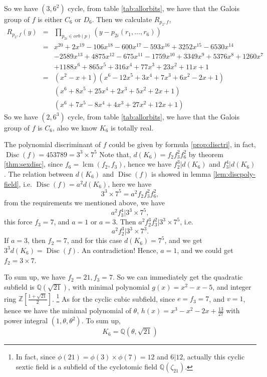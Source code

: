 So we have $(3,6^2)$ cycle, from table \ref{tab:allorbits}, we have that the Galois group of $f$ is either $C_6$ or $D_6$. Then we calculate $R_{p_2,f}$,
\begin{eqnarray*}
R_{p_2,f}(y)&=&\prod_{p_{2i}\in orb(p)}(y-p_{2i}(r_1,\dots,r_6))\\
&=& x^{20} + 2 x^{19} - 106 x^{18} - 600 x^{17} - 593 x^{16} + 3252 x^{15} - 6530 x^{14}\\
&& -2589 x^{13} + 4875 x^{12} - 675 x^{11} - 1759 x^{10} + 3349 x^9 + 5376 x^8 + 1260 x^7 \\
&&+ 1188 x^6 + 865 x^5 + 316 x^4 + 77 x^3 + 23 x^2 + 11 x + 1
\\
&=&(x^2 - x + 1) (x^6 - 12 x^5 + 3 x^4 + 7 x^3 + 6 x^2 - 2 x + 1) \\
&&(x^6 + 8 x^5 + 25 x^4 + 2 x^3 + 5 x^2 + 2 x + 1) \\
&&(x^6 + 7 x^5 - 8 x^4 + 4 x^3 + 27 x^2 + 12 x + 1)
\end{eqnarray*}  
So we have $(2,6^3)$ cycle, from table \ref{tab:allorbits}, we have that the Galois group of $f$ is $C_6$, also we know $K_6$ is totally real.

The polynomial discriminant of $f$ could be given by formula \ref{prop:disctri}, in fact, $\operatorname{Disc}(f)=453789=3^3\times7^5$
Note that, $d(K_6)=f_2f_3^2f_6^2$ by theorem \ref{thm:sexdisc}, since $f_6=\operatorname{lcm}(f_2,f_3)$, hence we have $f_2^3|d(K_6)$ and $f_3^4|d(K_6)$. The relation between $d(K_6)$ and $\operatorname{Disc}(f)$ is showed in lemma \ref{lem:discpoly-field}, i.e. $\operatorname{Disc}(f)=a^2d(K_6)$, here we have $$3^3\times 7^5=a^2 f_2f_3^2f_6^2,$$ from the requirements we mentioned above, we have $$a^2f_3^4|3^3\times7^5,$$ this force $f_3=7$, and $a=1$ or $a=3$. Then $a^2f_2^3f_3^2|3^3\times7^5$, i.e. $$a^2f_2^3|3^3\times7^3.$$ If $a=3$, then $f_2=7$, and for this case $d(K_6)=7^5$, and we get $3^3d(K_6)=\operatorname{Disc}(f)$. An contradiction! Hence, $a=1$, and we could get $f_2=3\times7$.

To sum up, we have $f_2=21,f_3=7$. So we can immediately get the quadratic subfield is $\mathbb{Q}(\sqrt{21})$, with minimal polynomial $g(x)=x^2-x-5$, and integer ring $\mathbb{Z}\left[\frac{1+\sqrt{21}}{2}\right]$. \footnote{In fact, since $\phi(21)=\phi(3)\times\phi(7)=12$ and $6|12$, actually this cyclic sextic field is a subfield of the cyclotomic field $\mathbb{Q}(\zeta_21)$.}  As for the cyclic cubic subfield, since $e=f_3=7$, and $v=1$, hence we have the minimal polynomial of $\theta$, $h(x)=x^3-x^2-2x+\frac{13}{27}$ with power integral $(1,\theta,\theta^2)$. To sum up, $$K_6=\mathbb{Q}(\theta,\sqrt{21})$$

